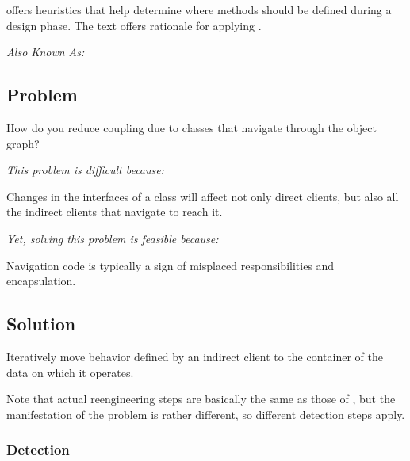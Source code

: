 \documentclass[a4paper,10pt,twoside]{book}
\begin{document}
 offers heuristics that help determine where methods should be defined during a design phase. The text offers rationale for applying .



\emph{Also Known As:}   \cite{Lieb88a}


\subsection*{Problem}

How do you reduce coupling due to classes that navigate through the object graph?

\emph{This problem is difficult because:} 

\begin{bulletlist}
\item Changes in the interfaces of a class will affect not only direct clients, but also all the indirect clients that navigate to reach it.
\end{bulletlist}

\emph{Yet, solving this problem is feasible because:}

\begin{bulletlist}
\item Navigation code is typically a sign of misplaced responsibilities and  encapsulation.
\end{bulletlist}

\subsection*{Solution}

Iteratively move behavior defined by an indirect client to the container of the data on which it operates.

Note that actual reengineering steps are basically the same as those of , but the manifestation of the problem is rather different, so different detection steps apply.

\subsubsection*{Detection}
\end{document}
